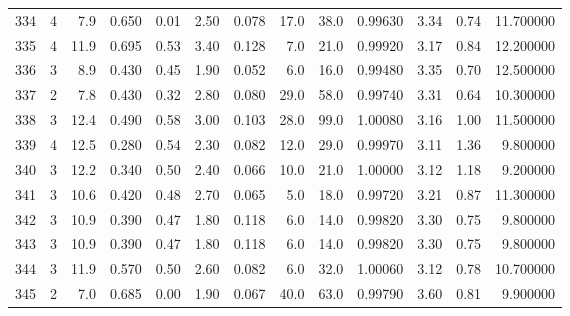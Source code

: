 \begin{tabular}{lrrrrrrrrrrrr}
334  &        4 &            7.9 &             0.650 &         0.01 &            2.50 &      0.078 &                 17.0 &                  38.0 &  0.99630 &  3.34 &       0.74 &  11.700000 \\
335  &        4 &           11.9 &             0.695 &         0.53 &            3.40 &      0.128 &                  7.0 &                  21.0 &  0.99920 &  3.17 &       0.84 &  12.200000 \\
336  &        3 &            8.9 &             0.430 &         0.45 &            1.90 &      0.052 &                  6.0 &                  16.0 &  0.99480 &  3.35 &       0.70 &  12.500000 \\
337  &        2 &            7.8 &             0.430 &         0.32 &            2.80 &      0.080 &                 29.0 &                  58.0 &  0.99740 &  3.31 &       0.64 &  10.300000 \\
338  &        3 &           12.4 &             0.490 &         0.58 &            3.00 &      0.103 &                 28.0 &                  99.0 &  1.00080 &  3.16 &       1.00 &  11.500000 \\
339  &        4 &           12.5 &             0.280 &         0.54 &            2.30 &      0.082 &                 12.0 &                  29.0 &  0.99970 &  3.11 &       1.36 &   9.800000 \\
340  &        3 &           12.2 &             0.340 &         0.50 &            2.40 &      0.066 &                 10.0 &                  21.0 &  1.00000 &  3.12 &       1.18 &   9.200000 \\
341  &        3 &           10.6 &             0.420 &         0.48 &            2.70 &      0.065 &                  5.0 &                  18.0 &  0.99720 &  3.21 &       0.87 &  11.300000 \\
342  &        3 &           10.9 &             0.390 &         0.47 &            1.80 &      0.118 &                  6.0 &                  14.0 &  0.99820 &  3.30 &       0.75 &   9.800000 \\
343  &        3 &           10.9 &             0.390 &         0.47 &            1.80 &      0.118 &                  6.0 &                  14.0 &  0.99820 &  3.30 &       0.75 &   9.800000 \\
344  &        3 &           11.9 &             0.570 &         0.50 &            2.60 &      0.082 &                  6.0 &                  32.0 &  1.00060 &  3.12 &       0.78 &  10.700000 \\
345  &        2 &            7.0 &             0.685 &         0.00 &            1.90 &      0.067 &                 40.0 &                  63.0 &  0.99790 &  3.60 &       0.81 &   9.900000 \\

\end{tabular}

